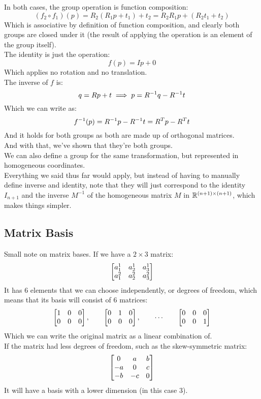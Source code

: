 \documentclass[12pt]{article}
\begin{document}
In both cases,
the group operation is function composition:
\[ (f_2 \circ f_1)(p) = R_2(R_1p + t_1) + t_2
= R_2R_1p + (R_2t_1 + t_2) \] 
Which is associative by definition of function
composition, and clearly both groups 
are closed under it
(the result of applying the operation
is an element of the group itself). \\

The identity is just the operation:
\[ f(p) = Ip + 0 \]
Which applies no rotation and no translation. \\

The inverse of $f$ is:
\[ q = Rp + t \implies  p = R^{-1} q - R^{-1} t \]
Which we can write as:
\[ f^{-1}(p) = R^{-1} p - R^{-1} t =
R^T p - R^T t \]
And it holds for both groups
as both are made up of orthogonal matrices. \\

And with that, we've shown that they're
both groups. \\

We can also define a group for the same
transformation, but represented
in homogeneous coordinates. \\
Everything we said thus far would apply,
but instead of having to manually define
inverse and identity,
note that they will just correspond
to the identity $I_{n+1}$
and the inverse $M^{-1}$
of the homogeneous matrix $M$ 
in $\mathbb{R}^{(n+1) \times (n+1)}$,
which makes things simpler. \\

\newpage

\subsection*{Matrix Basis}

Small note on matrix bases.
If we have a $2 \times 3$ matrix:
\[ \begin{bmatrix} a_1^1 & a_2^1 & a_3^1 \\
a_1^2 & a_2^2 & a_3^2 \end{bmatrix} \]
It has $6$ elements that we can choose independently,
or degrees of freedom,
which means that its basis will consist
of $6$ matrices:
\[ \begin{bmatrix} 1 & 0 & 0 \\ 0 & 0 & 0 \end{bmatrix}, \qquad
\begin{bmatrix} 0 & 1 & 0 \\ 0 & 0 & 0 \end{bmatrix}, \qquad \cdots
\qquad \begin{bmatrix} 0 & 0 & 0 \\ 0 & 0 & 1 \end{bmatrix} \]
Which we can write the original matrix as a linear
combination of. \\

If the matrix had less degrees of freedom,
such as the skew-symmetric matrix:
\[ \begin{bmatrix} 0 & a & b \\ -a & 0 & c \\ -b & -c & 0 \end{bmatrix} \]
It will have a basis with a lower dimension
(in this case $3$). \\

\newpage
\end{document}
